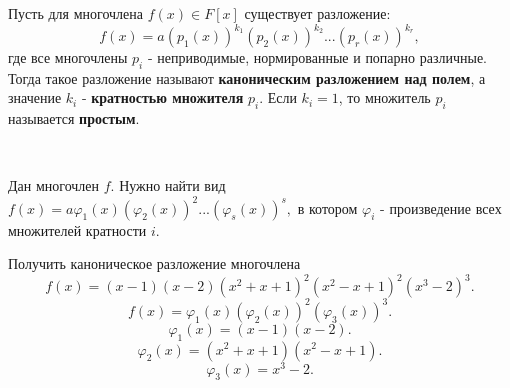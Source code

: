 \documentclass[12pt]{article}
\begin{document}
\begin{defn}
Пусть для многочлена $f(x) \in F[x]$ существует разложение: $$f(x) = a(p_1(x))^{k_1}(p_2(x))^{k_2}...(p_r(x))^{k_r},$$ где все многочлены $p_i$ - неприводимые, нормированные и попарно различные. Тогда такое разложение называют \textbf{каноническим разложением над полем}, а значение $k_i$ - \textbf{кратностью множителя} $p_i$. Если $k_i = 1$, то множитель $p_i$ называется \textbf{простым}.
\end{defn}

~\
\begin{task*}
Дан многочлен $f$. Нужно найти вид $f(x) = a\varphi_1(x)(\varphi_2(x))^2...(\varphi_s(x))^s,$ в котором $\varphi_i$ - произведение всех множителей кратности $i$.
\end{task*}

\begin{examp}
Получить каноническое разложение многочлена $$f(x) = (x - 1)(x - 2)(x^2 + x + 1)^2(x^2 - x + 1)^2(x^3 - 2)^3.$$
$$f(x) = \varphi_1(x)(\varphi_2(x))^2(\varphi_3(x))^3.$$
$$\varphi_1(x) = (x - 1)(x - 2).$$
$$\varphi_2(x) = (x^2 + x + 1)(x^2 - x + 1).$$
$$\varphi_3(x) = x^3 - 2.$$
\end{examp}
\end{document}
